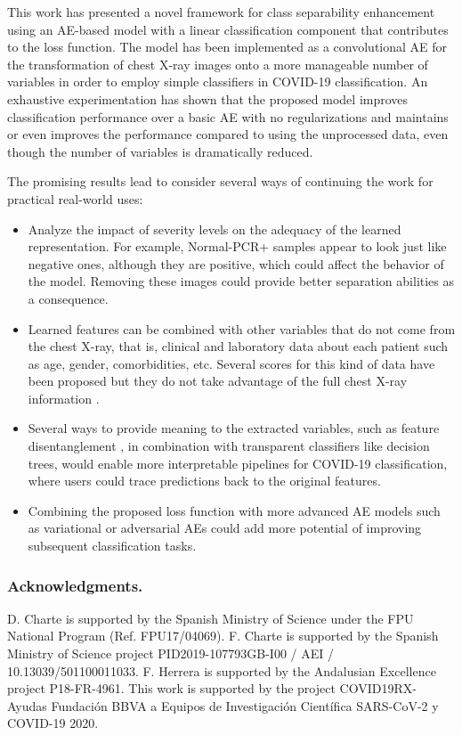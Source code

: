 This work has presented a novel framework for class separability enhancement using an AE-based model with a linear classification component that contributes to the loss function. The model has been implemented as a convolutional AE for the transformation of chest X-ray images onto a more manageable number of variables in order to employ simple classifiers in COVID-19 classification. An exhaustive experimentation has shown that the proposed model improves classification performance over a basic AE with no regularizations and maintains or even improves the performance compared to using the unprocessed data, even though the number of variables is dramatically reduced.

The promising results lead to consider several ways of continuing the work for practical real-world uses:
\begin{itemize}
    \item Analyze the impact of severity levels on the adequacy of the learned representation. For example, Normal-PCR+ samples appear to look just like negative ones, although they are positive, which could affect the behavior of the model. Removing these images could provide better separation abilities as a consequence.
    \item Learned features can be combined with other variables that do not come from the chest X-ray, that is, clinical and laboratory data about each patient such as age, gender, comorbidities, etc. Several scores for this kind of data have been proposed but they do not take advantage of the full chest X-ray information \cite{gong2020tool,knight2020risk}.
    \item Several ways to provide meaning to the extracted variables, such as feature disentanglement \cite{yu2019multi}, in combination with transparent classifiers like decision trees, would enable more interpretable pipelines for COVID-19 classification, where users could trace predictions back to the original features.
    \item Combining the proposed loss function with more advanced AE models such as variational or adversarial AEs could add more potential of improving subsequent classification tasks.
\end{itemize}

\subsubsection{Acknowledgments.} D. Charte is supported by the Spanish Ministry of Science under the FPU National Program (Ref. FPU17/04069). F. Charte is supported by the Spanish Ministry of Science project PID2019-107793GB-I00 / AEI / 10.13039/501100011033. F. Herrera is supported by the Andalusian Excellence project P18-FR-4961. This work is supported by the project COVID19RX-Ayudas Fundaci{\'o}n BBVA a Equipos de Investigaci{\'o}n Cient{\'i}fica SARS-CoV-2 y COVID-19 2020.

